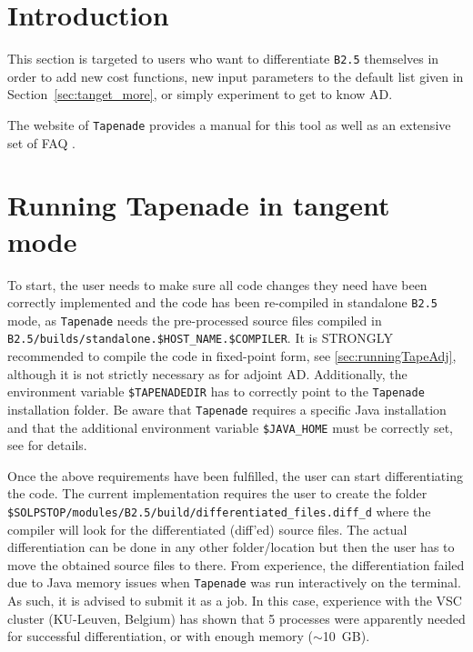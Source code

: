 \section{Introduction}\label{sec:expert}

This section is targeted to users who want to differentiate {\tt B2.5} themselves in order to add new cost functions, new input parameters to the default list given in Section~\ref{sec:tanget_more}, or simply experiment to get to know AD.

The website of {\tt Tapenade} provides a manual for this tool as well as an extensive set of FAQ \cite{tapesite}.

\section{Running Tapenade in tangent mode}\label{sec:runningTapeTgt}

To start, the user needs to make sure all code changes they need have been correctly implemented and the code has been re-compiled in standalone {\tt B2.5} mode, as {\tt Tapenade} needs the pre-processed source files compiled in {\tt B2.5/builds/standalone.\${HOST\_NAME}.\${COMPILER}}. It is STRONGLY recommended to compile the code in fixed-point form, see \ref{sec:runningTapeAdj}, although it is not strictly necessary as for adjoint AD. Additionally, the environment variable {\tt \$TAPENADEDIR} has to correctly point to the {\tt Tapenade} installation folder. Be aware that {\tt Tapenade} requires a specific Java installation and that the additional environment variable {\tt \$JAVA\_HOME} must be correctly set, see \cite{tapesite} for details.

Once the above requirements have been fulfilled, the user can start differentiating the code. The current implementation requires the user to create the folder {\tt \$SOLPSTOP/modules/B2.5/build/differentiated\_files.diff\_d} where the compiler will look for the differentiated (diff'ed) source files. The actual differentiation can be done in any other folder/location but then the user has to move the obtained source files to there. From experience, the differentiation failed due to Java memory issues when {\tt Tapenade} was run interactively on the terminal. As such, it is advised to submit it as a job. In this case, experience with the VSC cluster (KU-Leuven, Belgium) has shown that 5 processes were apparently needed for successful differentiation, or with enough memory (\(\sim \)10~GB).

